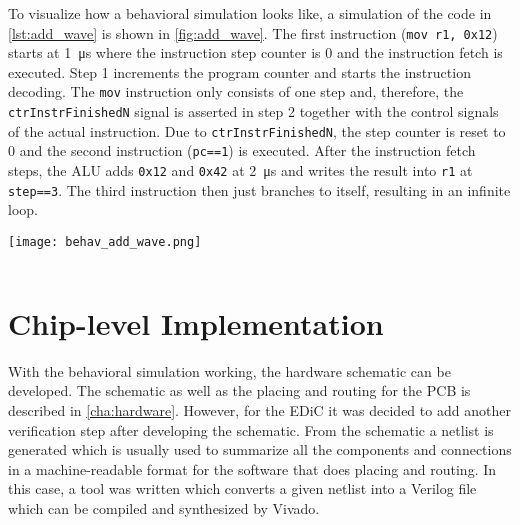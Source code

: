 To visualize how a behavioral simulation looks like, a simulation of the code in \cref{lst:add_wave} is shown in \cref{fig:add_wave}.
The first instruction (\texttt{mov r1, 0x12}) starts at \qty{1}{\micro\second} where the instruction step counter is 0 and the instruction fetch is executed.
Step 1 increments the program counter and starts the instruction decoding.
The \texttt{mov} instruction only consists of one step and, therefore, the \texttt{ctrInstrFinishedN} signal is asserted in step 2 together with the control signals of the actual instruction.
Due to \texttt{ctrInstrFinishedN}, the step counter is reset to 0 and the second instruction (\texttt{pc==1}) is executed.
After the instruction fetch steps, the \gls{ALU} adds \texttt{0x12} and \texttt{0x42} at \qty{2}{\micro\second} and writes the result into \texttt{r1} at \texttt{step==3}.
The third instruction then just branches to itself, resulting in an infinite loop.
\begin{sidewaysfigure}[p]
  \centering
  \texttt{[image: behav\_add\_wave.png]}
  \caption{Waveform of the relevant signals for setting a register to \texttt{0x12} and adding \texttt{0x2f} to it (Assembler code is shown in \cref{lst:add_wave}).}
  \label{fig:add_wave}
\end{sidewaysfigure}
\begin{listing}
  \inputminted[linenos,
    breaklines,
    frame=leftline,
    xleftmargin=20pt,
  ]{ARM}{src/sim_test.s}
  \caption{The code for the waveform example of \cref{fig:add_wave}.}
  \label{lst:add_wave}
\end{listing}

\section{Chip-level Implementation}
With the behavioral simulation working, the hardware schematic can be developed.
The schematic as well as the placing and routing for the \gls{PCB} is described in \cref{cha:hardware}.
However, for the \gls{EDiC} it was decided to add another verification step after developing the schematic.
From the schematic a netlist is generated which is usually used to summarize all the components and connections in a machine-readable format for the software that does placing and routing.
In this case, a tool was written which converts a given netlist into a Verilog file which can be compiled and synthesized by Vivado.
